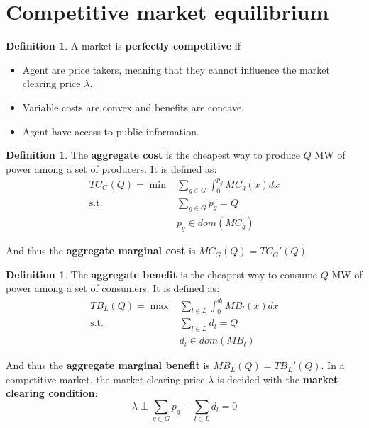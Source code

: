 \documentclass[12pt, openany]{report}
\theoremstyle{definition}
\newtheorem{definition}[thm]{Definition}
\begin{document}
\section{Competitive market equilibrium}
\begin{definition}
    A market is \textbf{perfectly competitive} if 
    \begin{itemize}
        \item Agent are price takers, meaning that they cannot influence the market clearing price $\lambda$.
        \item Variable costs are convex and benefits are concave.
        \item Agent have access to public information.
    \end{itemize}
\end{definition}
\begin{definition}
    The \textbf{aggregate cost} is the cheapest way to produce $Q$ MW of power among a set of producers. It is defined as:
    \begin{equation}
        \begin{aligned}
            TC_G(Q) = \min &\sum_{g \in G} \int_{0}^{p_g} MC_g(x)dx \\
            \text{s.t.} \quad & \sum_{g \in G} p_g = Q \\
            & p_g \in dom(MC_g)
        \end{aligned}
    \end{equation}
\end{definition}
And thus the \textbf{aggregate marginal cost} is $MC_G(Q) = TC_G'(Q)$
\begin{definition}
    The \textbf{aggregate benefit} is the cheapest way to consume $Q$ MW of power among a set of consumers. It is defined as:
    \begin{equation}
        \begin{aligned}
            TB_L(Q) = \max &\sum_{l \in L} \int_{0}^{d_l} MB_l(x)dx \\
            \text{s.t.} \quad & \sum_{l \in L} d_l = Q \\
            & d_l \in dom(MB_l)
        \end{aligned}
    \end{equation}
\end{definition}
And thus the \textbf{aggregate marginal benefit} is $MB_L(Q) = TB_L'(Q)$.
In a competitive market, the market clearing price $\lambda$ is decided with the \textbf{market clearing condition}:
\begin{equation}
    \lambda \perp \sum_{g \in G} p_g - \sum_{l \in L} d_l = 0
\end{equation}
\end{document}

